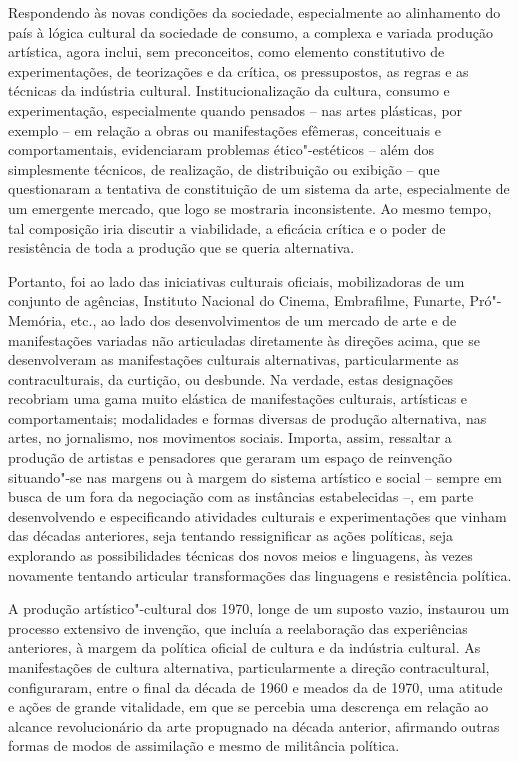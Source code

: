 Respondendo às novas condições da sociedade, especialmente ao
alinhamento do país à lógica cultural da sociedade de consumo, a
complexa e variada produção artística, agora inclui, sem preconceitos,
como elemento constitutivo de experimentações, de teorizações e da
crítica, os pressupostos, as regras e as técnicas da indústria cultural.
Institucionalização da cultura, consumo e experimentação, especialmente
quando pensados -- nas artes plásticas, por exemplo -- em relação a
obras ou manifestações efêmeras, conceituais e comportamentais,
evidenciaram problemas ético"-estéticos -- além dos simplesmente
técnicos, de realização, de distribuição ou exibição -- que questionaram
a tentativa de constituição de um sistema da arte, especialmente de um
emergente mercado, que logo se mostraria inconsistente. Ao mesmo tempo,
tal composição iria discutir a viabilidade, a eficácia crítica e o poder
de resistência de toda a produção que se queria alternativa.

Portanto, foi ao lado das iniciativas culturais oficiais, mobilizadoras
de um conjunto de agências, Instituto Nacional do Cinema, Embrafilme,
Funarte, Pró"-Memória, etc., ao lado dos desenvolvimentos de um mercado
de arte e de manifestações variadas não articuladas diretamente às
direções acima, que se desenvolveram as manifestações culturais
alternativas, particularmente as contraculturais, da curtição, ou
desbunde. Na verdade, estas designações recobriam uma gama muito
elástica de manifestações culturais, artísticas e comportamentais;
modalidades e formas diversas de produção alternativa, nas artes, no
jornalismo, nos movimentos sociais. Importa, assim, ressaltar a produção
de artistas e pensadores que geraram um espaço de reinvenção situando"-se
nas margens ou à margem do sistema artístico e social -- sempre em busca
de um fora da negociação com as instâncias estabelecidas --, em parte
desenvolvendo e especificando atividades culturais e experimentações que
vinham das décadas anteriores, seja tentando ressignificar as ações
políticas, seja explorando as possibilidades técnicas dos novos meios e
linguagens, às vezes novamente tentando articular transformações das
linguagens e resistência política.

A produção artístico"-cultural dos 1970, longe de um suposto vazio,
instaurou um processo extensivo de invenção, que incluía a reelaboração
das experiências anteriores, à margem da política oficial de cultura e
da indústria cultural. As manifestações de cultura alternativa,
particularmente a direção contracultural, configuraram, entre o final da
década de 1960 e meados da de 1970, uma atitude e ações de grande
vitalidade, em que se percebia uma descrença em relação ao alcance
revolucionário da arte propugnado na década anterior, afirmando outras
formas de modos de assimilação e mesmo de militância política.

